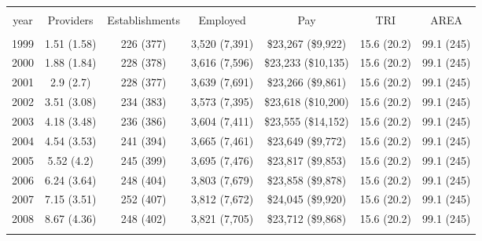 
\begin{table}[!htbp] \centering 
  \caption{} 
  \label{} 
\begin{tabular}{@{\extracolsep{5pt}} ccccccc} 
\\[-1.8ex]\hline 
\hline \\[-1.8ex] 
year & Providers & Establishments & Employed & Pay & TRI & AREA \\ 
\hline \\[-1.8ex] 
1999 & 1.51 (1.58) & 226 (377) & 3,520 (7,391) & \$23,267 (\$9,922) & 15.6 (20.2) & 99.1 (245) \\ 
2000 & 1.88 (1.84) & 228 (378) & 3,616 (7,596) & \$23,233 (\$10,135) & 15.6 (20.2) & 99.1 (245) \\ 
2001 & 2.9 (2.7) & 228 (377) & 3,639 (7,691) & \$23,266 (\$9,861) & 15.6 (20.2) & 99.1 (245) \\ 
2002 & 3.51 (3.08) & 234 (383) & 3,573 (7,395) & \$23,618 (\$10,200) & 15.6 (20.2) & 99.1 (245) \\ 
2003 & 4.18 (3.48) & 236 (386) & 3,604 (7,411) & \$23,555 (\$14,152) & 15.6 (20.2) & 99.1 (245) \\ 
2004 & 4.54 (3.53) & 241 (394) & 3,665 (7,461) & \$23,649 (\$9,772) & 15.6 (20.2) & 99.1 (245) \\ 
2005 & 5.52 (4.2) & 245 (399) & 3,695 (7,476) & \$23,817 (\$9,853) & 15.6 (20.2) & 99.1 (245) \\ 
2006 & 6.24 (3.64) & 248 (404) & 3,803 (7,679) & \$23,858 (\$9,878) & 15.6 (20.2) & 99.1 (245) \\ 
2007 & 7.15 (3.51) & 252 (407) & 3,812 (7,672) & \$24,045 (\$9,920) & 15.6 (20.2) & 99.1 (245) \\ 
2008 & 8.67 (4.36) & 248 (402) & 3,821 (7,705) & \$23,712 (\$9,868) & 15.6 (20.2) & 99.1 (245) \\ 
\hline \\[-1.8ex] 
\end{tabular} 
\end{table} 
